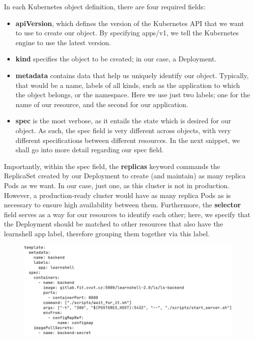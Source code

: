 \documentclass[thesis=B,english]{FITthesis}[2019/12/23]
\begin{document}
In each Kubernetes object definition, there are four required fields:

\begin{itemize}
  \setlength\itemsep{0em}
  \item \textbf{apiVersion}, which defines the version of the Kubernetes API that we want to use to create our object. By specifying apps/v1, we tell the Kubernetes engine to use the latest version.
  \item \textbf{kind} specifies the object to be created; in our case, a Deployment.
  \item \textbf{metadata} contains data that help us uniquely identify our object. Typically, that would be a name, labels of all kinds, such as the application to which the object belongs, or the namespace. Here we use just two labels; one for the name of our resource, and the second for our application.
  \item \textbf{spec} is the most verbose, as it entails the state which is desired for our object. As such, the spec field is very different across objects, with very different specifications between different resources. In the next snippet, we shall go into more detail regarding our spec field.
\end{itemize}

Importantly, within the spec field, the \textbf{replicas} keyword commands the ReplicaSet created by our Deployment to create (and maintain) as many replica Pods as we want. In our case, just one, as this cluster is not in production. However, a production-ready cluster would have as many replica Pods as is necessary to ensure high availability between them. Furthermore, the \textbf{selector} field serves as a way for our resources to identify each other; here, we specify that the Deployment should be matched to other resources that also have the learnshell app label, therefore grouping them together via this label.

\begin{figure}[H]
\centering
\hspace*{-0.5cm}
\includegraphics[scale=0.5]{deploy-backend2}
\end{figure}
\end{document}
